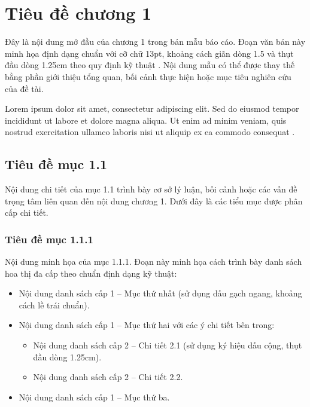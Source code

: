 
\chapter{Tiêu đề chương 1}
\label{chap:chapter_1}

Đây là nội dung mở đầu của chương 1 trong bản mẫu báo cáo. Đoạn văn bản này minh họa định dạng chuẩn với cỡ chữ 13pt, khoảng cách giãn dòng 1.5 và thụt đầu dòng 1.25cm theo quy định kỹ thuật \cite{doe2023}. Nội dung mẫu có thể được thay thế bằng phần giới thiệu tổng quan, bối cảnh thực hiện hoặc mục tiêu nghiên cứu của đề tài.

Lorem ipsum dolor sit amet, consectetur adipiscing elit. Sed do eiusmod tempor incididunt ut labore et dolore magna aliqua. Ut enim ad minim veniam, quis nostrud exercitation ullamco laboris nisi ut aliquip ex ea commodo consequat \cite{newman2021}.

\section{Tiêu đề mục 1.1}
\label{sec:section_1_1}

Nội dung chi tiết của mục 1.1 trình bày cơ sở lý luận, bối cảnh hoặc các vấn đề trọng tâm liên quan đến nội dung chương 1. Dưới đây là các tiểu mục được phân cấp chi tiết.

\subsection{Tiêu đề mục 1.1.1}
\label{subsec:subsection_1_1_1}

Nội dung minh họa của mục 1.1.1. Đoạn này minh họa cách trình bày danh sách hoa thị đa cấp theo chuẩn định dạng kỹ thuật:

\begin{itemize}
    \item Nội dung danh sách cấp 1 -- Mục thứ nhất (sử dụng dấu gạch ngang, khoảng cách lề trái chuẩn).
    \item Nội dung danh sách cấp 1 -- Mục thứ hai với các ý chi tiết bên trong:
          \begin{itemize}
              \item Nội dung danh sách cấp 2 -- Chi tiết 2.1 (sử dụng ký hiệu dấu cộng, thụt đầu dòng 1.25cm).
              \item Nội dung danh sách cấp 2 -- Chi tiết 2.2.
          \end{itemize}
    \item Nội dung danh sách cấp 1 -- Mục thứ ba.
\end{itemize}

